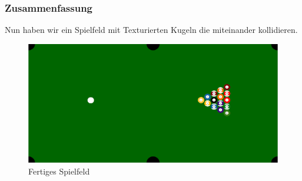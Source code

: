 
	\subsubsection{Zusammenfassung}
		 Nun haben wir ein Spielfeld mit Texturierten Kugeln die miteinander kollidieren.
		 \begin{figure}[h]
		 	\caption{Fertiges Spielfeld}
		 	\includegraphics[width=\textwidth]{bilder/Spielfeld.png}
		 \end{figure}

